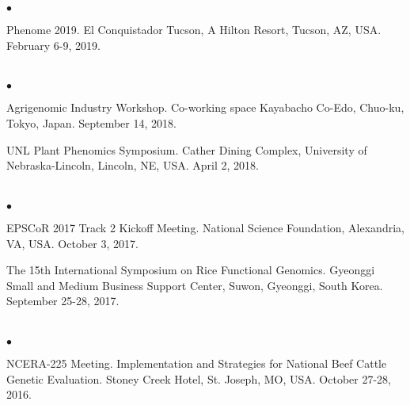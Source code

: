 \documentclass[margin,line,10pt]{res}
\newenvironment{list2}{
  \begin{list}{$\bullet$}{%
      \setlength{\itemsep}{0in}
      \setlength{\parsep}{0in} \setlength{\parskip}{0in}
      \setlength{\topsep}{0in} \setlength{\partopsep}{0in} 
      \setlength{\leftmargin}{0.2in}}}{\end{list}}
\begin{document}
\begin{resume}
\begin{list2}
  \vspace{0.5cm}

\item Phenome 2019. El Conquistador Tucson, A Hilton Resort, Tucson, AZ, USA. February 6-9, 2019.

\end{list2}




\section{}
\begin{list2}

  \item Agrigenomic Industry Workshop. Co-working space Kayabacho Co-Edo, Chuo-ku, Tokyo, Japan. September 14, 2018.

    \vspace{0.5cm}
    
\item UNL Plant Phenomics Symposium. Cather Dining Complex, University of Nebraska-Lincoln, Lincoln, NE, USA. April 2, 2018.

\end{list2}


\section{}
\begin{list2}

\item EPSCoR 2017 Track 2 Kickoff Meeting.  National Science Foundation, Alexandria, VA, USA. October 3, 2017.
  
  \vspace{0.5cm}

\item The 15th International Symposium on Rice Functional Genomics. Gyeonggi Small and Medium Business Support Center, Suwon, Gyeonggi, South Korea. September 25-28, 2017.

  
  \end{list2}  


\section{}
\begin{list2}

\item NCERA-225 Meeting. Implementation and Strategies for National Beef Cattle Genetic Evaluation. Stoney Creek Hotel, St. Joseph, MO, USA. October 27-28, 2016. 


\end{list2}
\end{resume}
\end{document}
